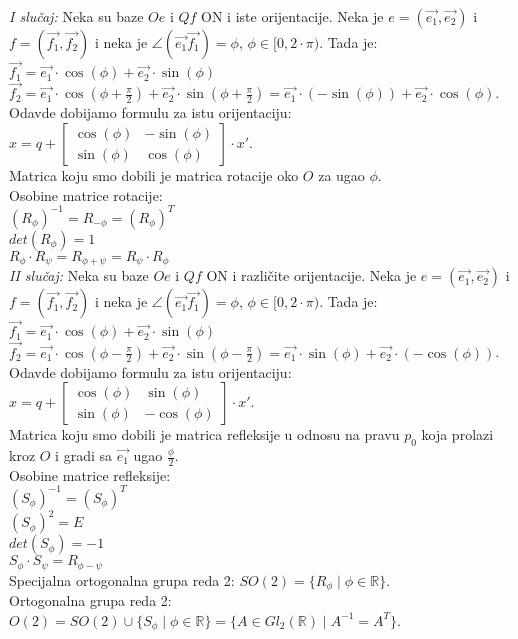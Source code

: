 \documentclass[12pt]{article}
\newcommand{\vek}[1]{\overrightarrow{#1}}
\begin{document}
    \textit{I slučaj:} Neka su baze $Oe$ i $Qf$ ON i iste orijentacije. Neka je $e=(\vek{e_1},\vek{e_2})$
    i $f=(\vek{f_1},\vek{f_2})$ i neka je $\angle(\vek{e_1}\vek{f_1})=\phi$, $\phi\in[0,2\cdot\pi)$.
    Tada je:\\
$\vek{f_1}=\vek{e_1}\cdot\cos(\phi)+\vek{e_2}\cdot\sin(\phi)$\\
$\vek{f_2}=\vek{e_1}\cdot\cos(\phi+\frac{\pi}{2})+\vek{e_2}\cdot\sin(\phi+\frac{\pi}{2})=\vek{e_1}\cdot(-\sin(\phi))+\vek{e_2}\cdot\cos(\phi)$.\\
    Odavde dobijamo formulu za istu orijentaciju: $x=q+\begin{bmatrix}
    \cos(\phi) & -\sin(\phi) \\
    \sin(\phi) & \cos(\phi)
\end{bmatrix}\cdot x'$.\\
    Matrica koju smo dobili je matrica rotacije oko $O$ za ugao $\phi$.\\
    Osobine matrice rotacije:\\
$(R_\phi)^{-1}=R_{-\phi}=(R_\phi)^T$\\
$det(R_\phi)=1$\\
$R_\phi\cdot R_\psi=R_{\phi+\psi}=R_\psi\cdot R_\phi$\\
    \textit{II slučaj:} Neka su baze $Oe$ i $Qf$ ON i različite orijentacije. Neka je $e=(\vek{e_1},\vek{e_2})$
    i $f=(\vek{f_1},\vek{f_2})$ i neka je $\angle(\vek{e_1}\vek{f_1})=\phi$, $\phi\in[0,2\cdot\pi)$.
    Tada je:\\
$\vek{f_1}=\vek{e_1}\cdot\cos(\phi)+\vek{e_2}\cdot\sin(\phi)$\\
$\vek{f_2}=\vek{e_1}\cdot\cos(\phi-\frac{\pi}{2})+\vek{e_2}\cdot\sin(\phi-\frac{\pi}{2})=\vek{e_1}\cdot\sin(\phi)+\vek{e_2}\cdot(-\cos(\phi))$.\\
    Odavde dobijamo formulu za istu orijentaciju: $x=q+\begin{bmatrix}
    \cos(\phi) & \sin(\phi)  \\
    \sin(\phi) & -\cos(\phi)
\end{bmatrix}\cdot x'$.\\
    Matrica koju smo dobili je matrica refleksije u odnosu na pravu $p_0$ koja
    prolazi kroz $O$ i gradi sa $\vek{e_1}$ ugao $\frac{\phi}{2}$.\\
    Osobine matrice refleksije:\\
$(S_\phi)^{-1}=(S_\phi)^T$\\
$(S_\phi)^{2}=E$\\
$det(S_\phi)=-1$\\
$S_\phi\cdot S_\psi=R_{\phi-\psi}$\\
    Specijalna ortogonalna grupa reda 2: $SO(2)=\{R_\phi\mid\phi\in\mathbb{R}\}$.\\
    Ortogonalna grupa reda 2: $O(2)=SO(2)\cup\{S_\phi\mid\phi\in\mathbb{R}\}=\{A\in Gl_2(\mathbb{R})\mid A^{-1}=A^T\}$.
\end{document}

